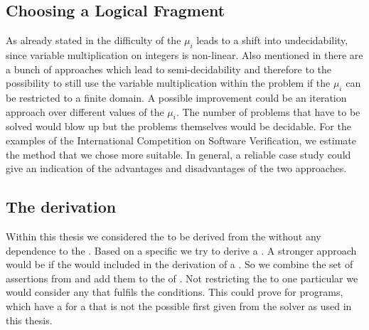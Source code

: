 \subsection{Choosing a Logical Fragment}
As already stated in  the difficulty of the $\mu_i$ leads to a shift into undecidability, since variable multiplication on integers is non-linear. Also mentioned in  there are a bunch of approaches which lead to semi-decidability and therefore to the possibility to still use the variable multiplication within the problem if the $\mu_i$ can be restricted to a finite domain.\newline
A possible improvement could be an iteration approach over different values of the $\mu_i$. The number of problems that have to be solved would blow up but the problems themselves would be decidable.\newline
For the examples of the International Competition on Software Verification, we estimate the method that we chose more suitable. In general, a reliable case study could give an indication of the advantages and disadvantages of the two approaches.

\subsection{The \stem derivation}
Within this thesis we considered the \stem to be derived from the \its without any dependence to the \loopt. Based on a specific \stem we try to derive a \gna. A stronger approach would be if the \stem would included in the derivation of a \gna. So we combine the set of assertions from  and add them to the \solver of . Not restricting the \gna to one particular \stem we would consider any \stem that fulfils the conditions. This could prove \nonterm for programs, which have a \gna for a \stem that is not the possible first \stem given from the solver as used in this thesis.

